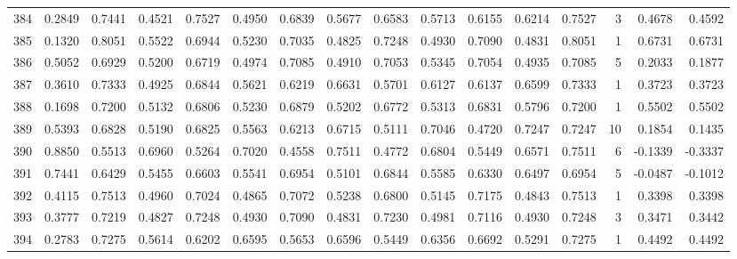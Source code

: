 \begin{tabular}{lrrrrrrrrrrrrrrr}
384 &      0.2849 &  0.7441 &  0.4521 &  0.7527 &  0.4950 &  0.6839 &  0.5677 &  0.6583 &  0.5713 &  0.6155 &   0.6214 &     0.7527 &      3 &                    0.4678 &                     0.4592 \\
385 &      0.1320 &  0.8051 &  0.5522 &  0.6944 &  0.5230 &  0.7035 &  0.4825 &  0.7248 &  0.4930 &  0.7090 &   0.4831 &     0.8051 &      1 &                    0.6731 &                     0.6731 \\
386 &      0.5052 &  0.6929 &  0.5200 &  0.6719 &  0.4974 &  0.7085 &  0.4910 &  0.7053 &  0.5345 &  0.7054 &   0.4935 &     0.7085 &      5 &                    0.2033 &                     0.1877 \\
387 &      0.3610 &  0.7333 &  0.4925 &  0.6844 &  0.5621 &  0.6219 &  0.6631 &  0.5701 &  0.6127 &  0.6137 &   0.6599 &     0.7333 &      1 &                    0.3723 &                     0.3723 \\
388 &      0.1698 &  0.7200 &  0.5132 &  0.6806 &  0.5230 &  0.6879 &  0.5202 &  0.6772 &  0.5313 &  0.6831 &   0.5796 &     0.7200 &      1 &                    0.5502 &                     0.5502 \\
389 &      0.5393 &  0.6828 &  0.5190 &  0.6825 &  0.5563 &  0.6213 &  0.6715 &  0.5111 &  0.7046 &  0.4720 &   0.7247 &     0.7247 &     10 &                    0.1854 &                     0.1435 \\
390 &      0.8850 &  0.5513 &  0.6960 &  0.5264 &  0.7020 &  0.4558 &  0.7511 &  0.4772 &  0.6804 &  0.5449 &   0.6571 &     0.7511 &      6 &                   -0.1339 &                    -0.3337 \\
391 &      0.7441 &  0.6429 &  0.5455 &  0.6603 &  0.5541 &  0.6954 &  0.5101 &  0.6844 &  0.5585 &  0.6330 &   0.6497 &     0.6954 &      5 &                   -0.0487 &                    -0.1012 \\
392 &      0.4115 &  0.7513 &  0.4960 &  0.7024 &  0.4865 &  0.7072 &  0.5238 &  0.6800 &  0.5145 &  0.7175 &   0.4843 &     0.7513 &      1 &                    0.3398 &                     0.3398 \\
393 &      0.3777 &  0.7219 &  0.4827 &  0.7248 &  0.4930 &  0.7090 &  0.4831 &  0.7230 &  0.4981 &  0.7116 &   0.4930 &     0.7248 &      3 &                    0.3471 &                     0.3442 \\
394 &      0.2783 &  0.7275 &  0.5614 &  0.6202 &  0.6595 &  0.5653 &  0.6596 &  0.5449 &  0.6356 &  0.6692 &   0.5291 &     0.7275 &      1 &                    0.4492 &                     0.4492 \\

\end{tabular}

